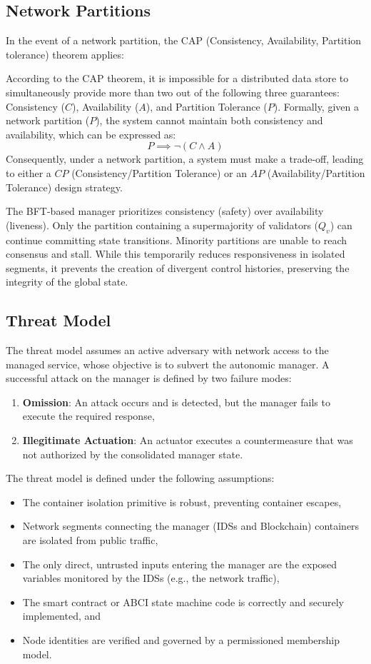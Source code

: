 \subsection{Network Partitions}
\label{subsec:network_partitions}

In the event of a network partition, the CAP (Consistency, Availability, Partition tolerance) theorem applies:

According to the CAP theorem, it is impossible for a distributed data store to simultaneously provide more than two out of the following three guarantees: Consistency ($C$), Availability ($A$), and Partition Tolerance ($P$). Formally, given a network partition ($P$), the system cannot maintain both consistency and availability, which can be expressed as:
\[
P \implies \neg (C \land A)
\]
Consequently, under a network partition, a system must make a trade-off, leading to either a $CP$ (Consistency/Partition Tolerance) or an $AP$ (Availability/Partition Tolerance) design strategy.


The BFT-based manager prioritizes consistency (safety) over availability (liveness). 
Only the partition containing a supermajority of validators ($Q_v$) can continue committing state transitions. Minority partitions are unable to reach consensus and stall. While this temporarily reduces responsiveness in isolated segments, it prevents the creation of divergent control histories, preserving the integrity of the global state.


\subsection{Threat Model}
\label{subsec:security_objectives}
The threat model assumes an active adversary with network access to the managed service, whose objective is to subvert the autonomic manager. A successful attack on the manager is defined by two failure modes:
\begin{enumerate}
    \item \textbf{Omission}: An attack occurs and is detected, but the manager fails to execute the required response,
    \item \textbf{Illegitimate Actuation}: An actuator executes a countermeasure that was not authorized by the consolidated manager state.
\end{enumerate}

The threat model is defined under the following assumptions:
\begin{itemize}
    \item The container isolation primitive is robust, preventing container escapes,
    \item Network segments connecting the manager (IDSs and Blockchain) containers are isolated from public traffic,
    \item The only direct, untrusted inputs entering the manager are the exposed variables monitored by the IDSs (e.g., the network traffic),
    \item The smart contract or ABCI state machine code is correctly and securely implemented, and
    \item Node identities are verified and governed by a permissioned membership model.
\end{itemize}

